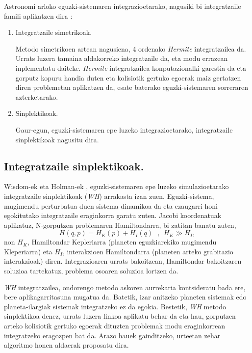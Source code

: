 Astronomi arloko eguzki-sistemaren integrazioetarako, nagusiki bi integratzaile famili aplikatzen dira \cite{Ito2007}: 
\begin{enumerate}
\item Integratzaile simetrikoak.

Metodo simetrikoen artean nagusiena, 4 ordenako \emph{Hermite} \cite{Aarseth2008} integratzailea da.
Urrats luzera tamaina aldakorreko integratzaile da, eta modu errazean inplementatu daiteke.  \emph{Hermite} integratzailea konputazionalki garestia da eta gorputz kopuru handia duten eta kolisiotik gertuko egoerak maiz gertatzen diren problemetan aplikatzen da, esate baterako eguzki-sistemaren sorreraren azterketarako.  

\item Sinplektikoak.

Gaur-egun, eguzki-sistemaren epe luzeko integrazioetarako, integratzaile sinplektikoak nagusitu dira. 

\end{enumerate}


\subsection*{Integratzaile sinplektikoak.}

Wisdom-ek eta Holman-ek \cite[1991]{Sussman1992}, eguzki-sistemaren epe luzeko simulazioetarako integratzaile  sinplektikoak (\emph{WH}) arrakasta izan zuen. Eguzki-sistema, mugimendu perturbatua duen sistema dinamikoa da eta ezaugarri honi egokitutako integratzaile eraginkorra garatu zuten. Jacobi koordenatuak  aplikatuz, N-gorputzen problemaren Hamiltondarra, bi zatitan banatu zuten,
\begin{equation*}
H(q,p)=H_K(p)+H_I(q) \ \ \ , \ \ H_K\gg H_I,
\end{equation*}
non $H_K$, Hamiltondar Kepleriarra (planeten eguzkiarekiko mugimendu Kleperiarra) eta $H_I$, interakzioen Hamiltondarra (planeten arteko grabitazio interakzioak) diren. Integrazioaren urrats bakoitzean, Hamiltondar bakoitzaren soluzioa tartekatuz, problema osoaren soluzioa lortzen da.  

\emph{WH} integratzailea, ondorengo metodo askoren aurrekaria kontsideratu bada ere, bere aplikagarritasuna mugatua da. Batetik, izar anitzeko planeten sistemak edo planeta-ilargiak sistemak integratzeko ez da egokia. Bestetik, \emph{WH} metodo sinplektikoa denez, urrats luzera finkoa aplikatu behar da eta hau, gorputzen arteko kolisiotik gertuko egoerak dituzten problemak modu eraginkorrean integratzeko eragozpen bat da. Arazo hauek gainditzeko, urteetan zehar algoritmo honen aldaerak proposatu dira. 

